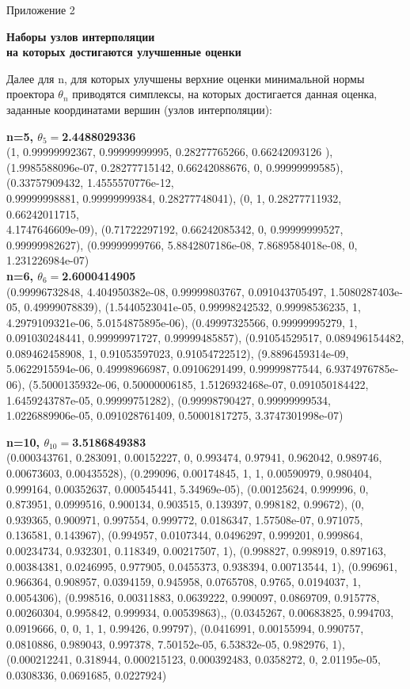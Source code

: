 \documentclass[12pt, a4paper]{extarticle}
\begin{document}
\newpage
\begin{flushright}
Приложение 2
\end{flushright}
\begin{center}
	{\bf Наборы узлов интерполяции \\ на которых достигаются улучшенные оценки}
\end{center}
Далее для n, для которых улучшены верхние оценки минимальной нормы проектора $\theta_n$ приводятся симплексы, на которых достигается данная оценка, заданные координатами вершин 
(узлов интерполяции):
\begin{center}
{\bf\boldmath n=5, $\theta_{5}=$2.4488029336}\\
(1, 0.99999992367, 0.99999999995, 0.28277765266, 0.66242093126 ),
(1.9985588096e-07, 0.28277715142, 0.66242088676, 0, 0.99999999585),
(0.33757909432, 1.4555570776e-12,\\ 0.99999998881, 0.99999999384, 0.28277748041),
(0, 1, 0.28277711932, 0.66242011715,\\ 4.1747646609e-09),
(0.71722297192, 0.66242085342, 0, 0.99999999527, 0.99999982627),
(0.99999999766, 5.8842807186e-08, 7.8689584018e-08, 0, 1.231226984e-07) \\

{\bf\boldmath n=6, $\theta_{6}=$2.6000414905}\\
(0.99996732848, 4.404950382e-08, 0.99999803767, 0.091043705497, 1.5080287403e-05, 0.49999078839),
(1.5440523041e-05, 0.99998242532, 0.99998536235, 1, 4.2979109321e-06, 5.0154875895e-06),
(0.49997325566, 0.99999995279, 1, 0.091030248441, 0.99999971727, 0.99999485857),
(0.91054529517, 0.089496154482, 0.089462458908, 1, 0.91053597023, 0.91054722512),
(9.8896459314e-09, 5.0622915594e-06, 0.49998966987, 0.09106291499, 0.99999877544, 6.9374976785e-06),
(5.5000135932e-06, 0.50000006185, 1.5126932468e-07, 0.091050184422, 1.6459243787e-05, 0.99999751282),
(0.99998790427, 0.99999999534, 1.0226889906e-05, 0.091028761409, 0.50001817275, 3.3747301998e-07)

{\bf\boldmath n=10, $\theta_{10}=$3.5186849383}\\
(0.000343761, 0.283091, 0.00152227, 0, 0.993474, 0.97941, 0.962042, 0.989746, 0.00673603, 0.00435528),
(0.299096, 0.00174845, 1, 1, 0.00590979, 0.980404, 0.999164, 0.00352637, 0.000545441, 5.34969e-05),
(0.00125624, 0.999996, 0, 0.873951, 0.0999516, 0.900134, 0.903515, 0.139397, 0.998182, 0.99672),
(0, 0.939365, 0.900971, 0.997554, 0.999772, 0.0186347, 1.57508e-07, 0.971075, 0.136581, 0.143967),
(0.994957, 0.0107344, 0.0496297, 0.999201, 0.999864, 0.00234734, 0.932301, 0.118349, 0.00217507, 1),
(0.998827, 0.998919, 0.897163, 0.00384381, 0.0246995, 0.977905, 0.0455373, 0.938394, 0.00713544, 1),
(0.996961, 0.966364, 0.908957, 0.0394159, 0.945958, 0.0765708, 0.9765, 0.0194037, 1, 0.0054306),
(0.998516, 0.00311883, 0.0639222, 0.990097, 0.0869709, 0.915778, 0.00260304, 0.995842, 0.999934, 0.00539863),, 
(0.0345267, 0.00683825, 0.994703, 0.0919666, 0, 0, 1, 1, 0.99426, 0.99797),
(0.0416991, 0.00155994, 0.990757, 0.0810886, 0.989043, 0.997378, 7.50152e-05, 6.53832e-05, 0.982976, 1),
(0.000212241, 0.318944, 0.000215123, 0.000392483, 0.0358272, 0, 2.01195e-05, 0.0308336, 0.0691685, 0.0227924)


\end{center}
\end{document}
